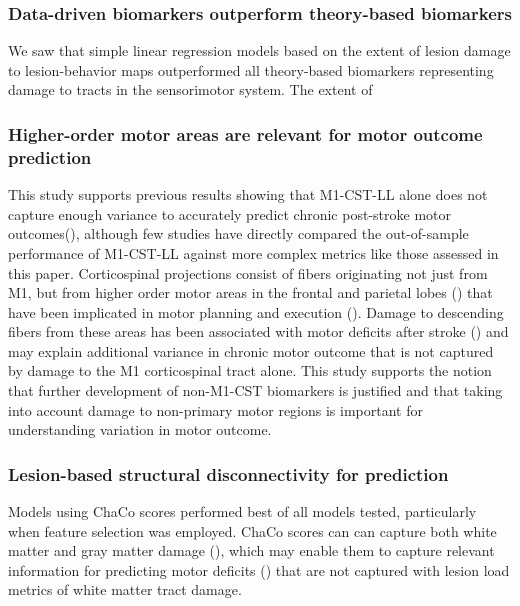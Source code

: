 \documentclass[10pt]{article}
\begin{document}
\subsubsection*{Data-driven biomarkers outperform theory-based biomarkers}
We saw that simple linear regression models based on the extent of lesion damage to lesion-behavior maps outperformed all theory-based biomarkers representing damage to tracts in the sensorimotor system. The extent of 

\subsubsection*{Higher-order motor areas are relevant for motor outcome prediction}
This study supports previous results showing that M1-CST-LL alone does not capture enough variance to accurately predict chronic post-stroke motor outcomes(\cite{Rondina2017-ij, Park2016-te, Ito2022-em}), although few studies have directly compared the out-of-sample performance of M1-CST-LL against more complex metrics like those assessed in this paper. Corticospinal projections consist of fibers originating not just from M1, but from higher order motor areas in the frontal and parietal lobes (\cite{Galea1994-yi}) that have been implicated in motor planning and execution (\cite{Ball1999-yo}). Damage to descending fibers from these areas has been associated with motor deficits after stroke (\cite{Ito2022-em, Riley2011-xo}) and may explain additional variance in chronic motor outcome that is not captured by damage to the M1 corticospinal tract alone. This study supports the notion that further development of non-M1-CST biomarkers is justified and that taking into account damage to non-primary motor regions is important for understanding variation in motor outcome.

\subsubsection*{Lesion-based structural disconnectivity for prediction}

Models using ChaCo scores performed best of all models tested, particularly when feature selection was employed. ChaCo scores can can capture both white matter and gray matter damage (\cite{Kuceyeski2013-nk}), which may enable them to capture relevant information for predicting motor deficits (\cite{Park2016-te,Rondina2016-ds}) that are not captured with lesion load metrics of white matter tract damage. 
\end{document}

